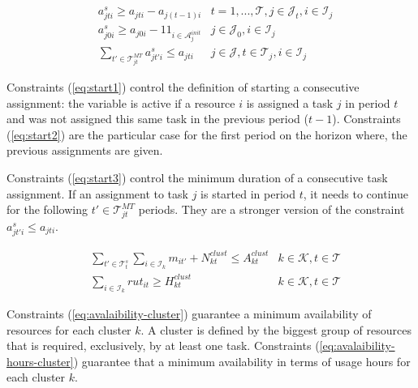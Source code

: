 \documentclass[a4paper,onecolumn,fleqn]{article}
\begin{document}
    \begin{align}
        & a^s_{jti} \geq a_{jti} - a_{j(t-1)i}
                & t =1, ..., \mathcal{T}, j \in \mathcal{J}_t, i \in \mathcal{I}_j \label{eq:start1} \\
        & a^s_{j0i} \geq a_{j0i} - 1 \!1_{i \in \mathcal{A}^{init}_{j}}
                & j \in \mathcal{J}_0, i \in \mathcal{I}_j \label{eq:start2} \\        
        & \sum_{t' \in \mathcal{T}^{MT}_{jt}} a^s_{jt'i} \leq a_{jti} 
        & j \in \mathcal{J}, t \in \mathcal{T}_j, i \in \mathcal{I}_j \label{eq:start3}
    \end{align}

    Constraints (\ref{eq:start1}) control the definition of starting a consecutive assignment: the variable is active if a resource $i$ is assigned a task $j$ in period $t$ and was not assigned this same task in the previous period ($t-1$). Constraints (\ref{eq:start2}) are the particular case for the first period on the horizon where, the previous assignments are given.

    Constraints (\ref{eq:start3}) control the minimum duration of a consecutive task assignment. If an assignment to task $j$ is started in period $t$, it needs to continue for the following $t' \in \mathcal{T}^{MT}_{jt}$ periods. They are a stronger version of the constraint $ a^s_{jt'i} \leq a_{jti}$.

    \begin{align}
       & \sum_{t' \in \mathcal{T}^{s}_t} \sum_{i \in \mathcal{I}_k} m_{it'} + N^{clust}_{kt} \leq A^{clust}_{kt}
        &k \in \mathcal{K}, t \in \mathcal{T} \label{eq:avalaibility-cluster} \\
       & \sum_{i \in \mathcal{I}_k} rut_{it} \geq H^{clust}_{kt}
        &k \in \mathcal{K}, t \in \mathcal{T} \label{eq:avalaibility-hours-cluster}
    \end{align}

    Constraints (\ref{eq:avalaibility-cluster}) guarantee a minimum availability of resources for each cluster $k$. A cluster is defined by the biggest group of resources that is required, exclusively, by at least one task. Constraints (\ref{eq:avalaibility-hours-cluster}) guarantee that a minimum availability in terms of usage hours for each cluster $k$.
\end{document}
